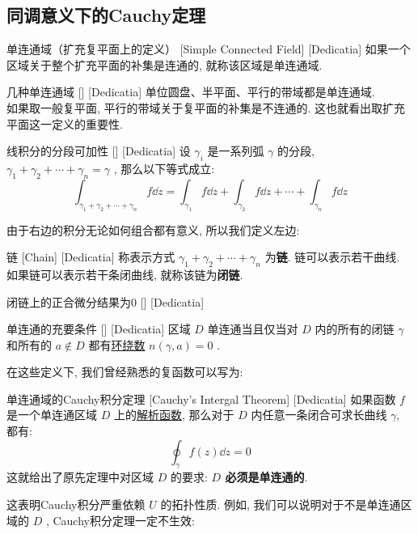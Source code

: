 \documentclass[UTF8]{ctexart}
\newcommand{\AnalyticalFunction}{\hyperref[dfn:AnalyticalFunction]{解析函数}}
\begin{document}
\subsection{同调意义下的Cauchy定理}
\begin{dfn}
    [UUID]
    {单连通域（扩充复平面上的定义）}
    [Simple Connected Field]
    [Dedicatia]
    如果一个区域关于整个扩充平面的补集是连通的, 就称该区域是单连通域. 
\end{dfn}
\begin{xmp}
    [UUID]
    {几种单连通域}
    []
    [Dedicatia]
    单位圆盘、半平面、平行的带域都是单连通域. \\
    如果取一般复平面, 平行的带域关于复平面的补集是不连通的. 这也就看出取扩充平面这一定义的重要性. 
\end{xmp}
\begin{ppt}
    [UUID]
    {线积分的分段可加性}
    []
    [Dedicatia]
    设 \( \gamma_i \) 是一系列弧 \( \gamma \) 的分段,  \( \gamma_1+\gamma_2+\cdots+\gamma_n=\gamma \) , 那么以下等式成立: 
    \[\int_{\gamma_1+\gamma_2+\cdots+\gamma_n}f\dd{z}=\int_{\gamma_1}f\dd{z}+\int_{\gamma_2}f\dd{z}+\cdots+\int_{\gamma_n}f\dd{z}\]
\end{ppt}
由于右边的积分无论如何组合都有意义, 所以我们定义左边: 
\begin{dfn}
    [UUID]
    {链}
    [Chain]
    [Dedicatia]
    称表示方式 \( \gamma_1+\gamma_2+\cdots+\gamma_n \) 为\textbf{链}. 链可以表示若干曲线. 如果链可以表示若干条闭曲线, 就称该链为\textbf{闭链}. 
\end{dfn}
\begin{ppt}
    [UUID]
    {闭链上的正合微分结果为0}
    []
    [Dedicatia]
\end{ppt}
\begin{thm}
    [UUID]
    {单连通的充要条件}
    []
    [Dedicatia]
    区域 \( D \) 单连通当且仅当对 \( D \) 内的所有的闭链 \( \gamma \) 和所有的 \( a\notin D \) 都有\hyperref[dfn:WindingNumber]{环绕数} \( n(\gamma,a)=0 \) .
\end{thm}
在这些定义下, 我们曾经熟悉的复函数可以写为: 
\begin{thm}
    [UUID]
    {单连通域的Cauchy积分定理}
    [Cauchy's Intergal Theorem]
    [Dedicatia]
    如果函数 \( f \) 是一个单连通区域 \( D \) 上的\AnalyticalFunction, 那么对于 \( D \) 内任意一条闭合可求长曲线 \( \gamma \), 都有: 
    \[\oint_{\gamma} f(z) \dd z = 0\]
    这就给出了原先定理中对区域 \( D \) 的要求: \textbf{ \( D \) 必须是单连通的}. 
\end{thm}
这表明Cauchy积分严重依赖 \( U \) 的拓扑性质. 例如, 我们可以说明对于不是单连通区域的 \( D \) , Cauchy积分定理一定不生效: 
\end{document}
